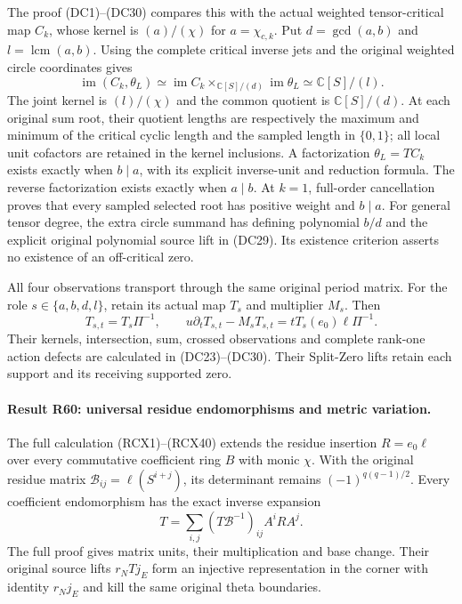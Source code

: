 The proof (DC1)--(DC30) compares this with the actual weighted
tensor-critical map $C_k$, whose kernel is $(a)/(\chi)$ for
$a=\chi_{c,k}$. Put $d=\gcd(a,b)$ and $l=\operatorname{lcm}(a,b)$.
Using the complete critical inverse jets and the original weighted
circle coordinates gives
\[
 \operatorname{im}(C_k,\theta_L)
   \simeq\operatorname{im}C_k
        \mathop{\times}_{\mathbb C[S]/(d)}\operatorname{im}\theta_L
   \simeq\mathbb C[S]/(l).
\]
The joint kernel is $(l)/(\chi)$ and the common quotient is
$\mathbb C[S]/(d)$. At each original sum root, their quotient
lengths are respectively the maximum and minimum of the critical
cyclic length and the sampled length in $\{0,1\}$; all local unit
cofactors are retained in the kernel inclusions. A factorization
$\theta_L=T C_k$ exists exactly when $b\mid a$, with its explicit
inverse-unit and reduction formula. The reverse factorization exists
exactly when $a\mid b$. At $k=1$, full-order cancellation proves
that every sampled selected root has positive weight and $b\mid a$.
For general tensor degree, the extra circle summand has defining
polynomial $b/d$ and the explicit original polynomial source lift
in (DC29). Its existence criterion asserts no existence of an
off-critical zero.

All four observations transport through the same original period
matrix. For the role $s\in\{a,b,d,l\}$, retain its actual map $T_s$
and multiplier $M_s$. Then
\[
 T_{s,t}=T_s\Pi^{-1},\qquad
 u\partial_tT_{s,t}-M_sT_{s,t}
       =tT_s(e_0)\ell\Pi^{-1}.
\]
Their kernels, intersection, sum, crossed observations and complete
rank-one action defects are calculated in (DC23)--(DC30). Their
Split-Zero lifts retain each support and its receiving supported zero.

\paragraph{Result R60: universal residue endomorphisms and metric variation.}
The full calculation (RCX1)--(RCX40) extends the residue insertion
$R=e_0\ell$ over every commutative coefficient ring $B$ with monic
$\chi$. With the original residue matrix
$\mathcal B_{ij}=\ell(S^{i+j})$, its determinant remains
$(-1)^{q(q-1)/2}$. Every coefficient endomorphism has the exact inverse
expansion
\[
 T=\sum_{i,j}(T\mathcal B^{-1})_{ij}A^iRA^j.
\]
The full proof gives matrix units, their multiplication and base
change. Their original source lifts $r_NTj_E$ form an injective
representation in the corner with identity $r_Nj_E$ and kill the
same original theta boundaries.

